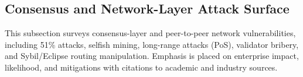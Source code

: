 \subsection{Consensus and Network-Layer Attack Surface}
This subsection surveys consensus-layer and peer-to-peer network vulnerabilities, including 51\% attacks, selfish mining, long-range attacks (PoS), validator bribery, and Sybil/Eclipse routing manipulation. Emphasis is placed on enterprise impact, likelihood, and mitigations with citations to academic and industry sources.



